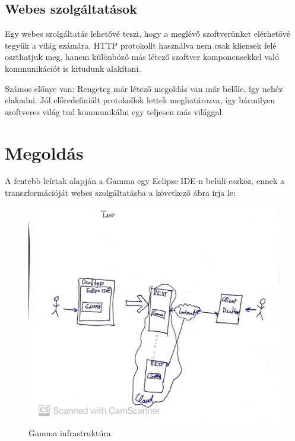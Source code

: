 \subsection{Webes szolgáltatások}

Egy webes szolgáltatás lehetővé teszi, hogy a meglévő szoftverünket elérhetővé tegyük a világ számára. HTTP protokollt használva nem csak kliensek felé oszthatjuk meg, hanem különböző más létező szoftver komponensekkel való kommunikációt is kitudunk alakítani.

Számos előnye van: Rengeteg már létező megoldás van már belőle, így nehéz elakadni. Jól előredefiniált protokollok lettek meghatározva, így bármilyen szoftveres világ tud kommunikálni egy teljesen más világgal.

\section{Megoldás}
A fentebb leírtak alapján a Gamma egy Eclipse IDE-n belüli eszköz, ennek a transzformációját webes szolgáltatásba a következő ábra írja le:

\begin{figure}[t]
	\centering
	\includegraphics[width=150mm, keepaspectratio]{figures/transformation.jpg}
	\caption{Gamma infrastruktúra}
	\label{fig:TeXstudio}
\end{figure}


